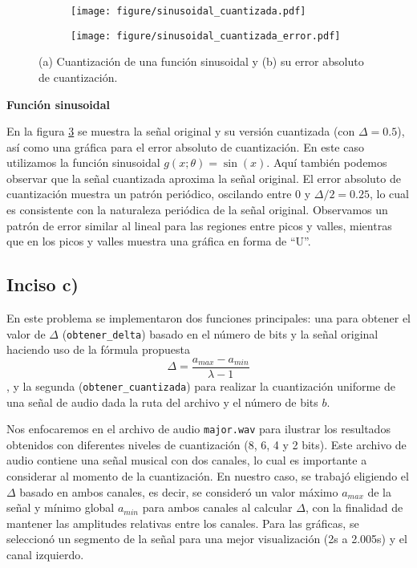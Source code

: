 \documentclass[paper=letter, fontsize=11pt, draft=false]{scrartcl}
\numberwithin{equation}{problemcounter} %
\numberwithin{figure}{problemcounter} %
\numberwithin{table}{problemcounter} %
\numberwithin{subsection}{problemcounter}
\begin{document}
\begin{figure}
    \centering
    \begin{subfigure}[b]{0.8\linewidth}
        \centering
        \texttt{[image: figure/sinusoidal\_cuantizada.pdf]}
        \caption{}
        \label{fig:sinusoidal_a}
    \end{subfigure}
    \vspace{0.5cm}
    \begin{subfigure}[b]{0.8\linewidth}
        \centering
        \texttt{[image: figure/sinusoidal\_cuantizada\_error.pdf]}
        \caption{}
        \label{fig:sinusoidal_b}
    \end{subfigure}
    \caption{(a) Cuantización de una función sinusoidal y (b) su error absoluto de cuantización.}
    \label{fig:sinusoidal}
\end{figure}

\textbf{Función sinusoidal}

En la figura \ref{fig:sinusoidal} se muestra la señal original y su versión cuantizada (con $\Delta = 0.5$), así como una gráfica para el error absoluto de cuantización. En este caso utilizamos la función sinusoidal $g(x; \theta) = \sin(x)$. Aquí también podemos observar que la señal cuantizada aproxima la señal original. El error absoluto de cuantización muestra un patrón periódico, oscilando entre 0 y $\Delta/2 = 0.25$, lo cual es consistente con la naturaleza periódica de la señal original. Observamos un patrón de error similar al lineal para las regiones entre picos y valles, mientras que en los picos y valles muestra una gráfica en forma de ``U''.





\subsection{Inciso c)}
En este problema se implementaron dos funciones principales: una para obtener el valor de $\Delta$ (\texttt{obtener\_delta}) basado en el número de bits y la señal original haciendo uso de la fórmula propuesta $$\Delta = \frac{a_{max}-a_{min}}{\lambda-1}$$, y la segunda (\texttt{obtener\_cuantizada}) para realizar la cuantización uniforme de una señal de audio dada la ruta del archivo y el número de bits $b$.

Nos enfocaremos en el archivo de audio \texttt{major.wav} para ilustrar los resultados obtenidos con diferentes niveles de cuantización (8, 6, 4 y 2 bits). Este archivo de audio contiene una señal musical con dos canales, lo cual es importante a considerar al momento de la cuantización. En nuestro caso, se trabajó eligiendo el $\Delta$ basado en ambos canales, es decir, se consideró un valor máximo $a_{max}$ de la señal y mínimo global $a_{min}$ para ambos canales al calcular $\Delta$, con la finalidad de mantener las amplitudes relativas entre los canales. Para las gráficas, se seleccionó un segmento de la señal para una mejor visualización (2s a 2.005s) y el canal izquierdo.
\end{document}
